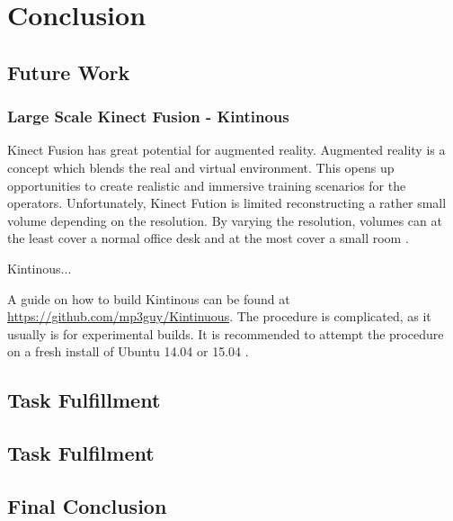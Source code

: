 \chapter{Conclusion}
\label{chp:conclusion} 

\section{Future Work}

\subsection{Large Scale Kinect Fusion - Kintinous}

Kinect Fusion has great potential for augmented reality. Augmented reality is a concept which blends the real and virtual environment. This opens up opportunities to create realistic and immersive training scenarios for the operators. Unfortunately, Kinect Fution is limited reconstructing a rather small volume depending on the resolution. By varying the resolution, volumes can at the least cover a normal office desk and at the most cover a small room \cite{keylist}.  

Kintinous...

A guide on how to build Kintinous can be found  at \href{Github}{https://github.com/mp3guy/Kintinuous}. The procedure is complicated, as it usually is for experimental builds. It is recommended to attempt the procedure on a fresh install of Ubuntu 14.04 or 15.04 \cite{Kintinous}.

\section{Task Fulfillment}

\section{Task Fulfilment}

\section{Final Conclusion}
